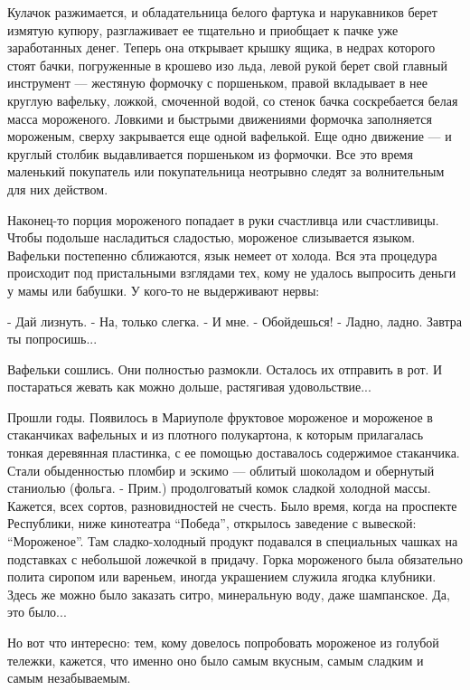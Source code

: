 Кулачок разжимается, и обладательница белого фартука и нарукавников берет
измятую купюру, разглаживает ее тщательно и приобщает к пачке уже заработанных
денег. Теперь она открывает крышку ящика, в недрах которого стоят бачки,
погруженные в крошево изо льда, левой рукой берет свой главный инструмент —
жестяную формочку с поршеньком, правой вкладывает в нее круглую вафельку,
ложкой, смоченной водой, со стенок бачка соскребается белая масса мороженого.
Ловкими и быстрыми движениями формочка заполняется мороженым, сверху
закрывается еще одной вафелькой. Еще одно движение — и круглый столбик
выдавливается поршеньком из формочки. Все это время маленький покупатель или
покупательница неотрывно следят за волнительным для них действом.

Наконец-то порция мороженого попадает в руки счастливца или счастливицы. Чтобы
подольше насладиться сладостью, мороженое слизывается языком. Вафельки
постепенно сближаются, язык немеет от холода. Вся эта процедура происходит под
пристальными взглядами тех, кому не удалось выпросить деньги у мамы или
бабушки. У кого-то не выдерживают нервы:

- Дай лизнуть. - На, только слегка. - И мне. - Обойдешься! - Ладно, ладно.
Завтра ты попросишь...

Вафельки сошлись. Они полностью размокли. Осталось их отправить в рот. И
постараться жевать как можно дольше, растягивая удовольствие... 

Прошли годы. Появилось в Мариуполе фруктовое мороженое и мороженое в
стаканчиках вафельных и из плотного полукартона, к которым прилагалась тонкая
деревянная пластинка, с ее помощью доставалось содержимое стаканчика. Стали
обыденностью пломбир и эскимо — облитый шоколадом и обернутый станиолью
(фольга. - Прим.) продолговатый комок сладкой холодной массы. Кажется, всех
сортов, разновидностей не счесть. Было время, когда на проспекте Республики,
ниже кинотеатра \enquote{Победа}, открылось заведение с  вывеской: \enquote{Мороженое}. Там
сладко-холодный продукт подавался в специальных чашках на подставках с
небольшой ложечкой в придачу. Горка мороженого была обязательно полита сиропом
или вареньем, иногда украшением служила ягодка клубники. Здесь же можно было
заказать ситро, минеральную воду, даже шампанское. Да, это было... 

Но вот что интересно: тем, кому довелось попробовать мороженое из голубой
тележки, кажется, что именно оно было самым вкусным, самым сладким и самым
незабываемым. 
